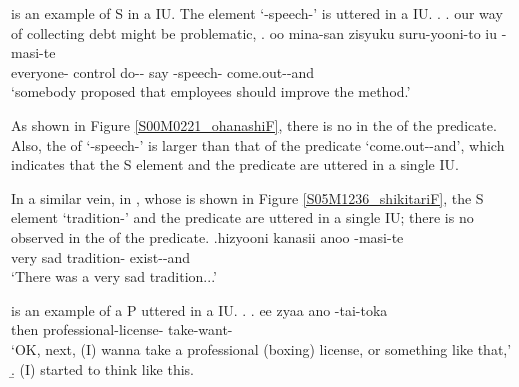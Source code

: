 \Next[b] is an example of S in a  IU.
The element  `-speech-'
is uttered in a  IU.
%
\ex.\label{S00M0221_ohanashi}
 \a. our way of collecting debt might be problematic,
 \bg. oo mina-san \tp{\dvline} zisyuku suru-yooni-to iu \tp{\dvline}  -masi-te \tp{\dvline} \\
 	 everyone- {} control do-- say {} -speech- come.out--and {} \\
 		`somebody proposed that employees should improve the method.'

As shown in Figure \ref{S00M0221_ohanashiF},
there is no  in the  of the predicate.
Also,
the  of  `-speech-' is larger
than that of the predicate  `come.out--and',
which indicates that the S element and the predicate are uttered in a single IU.

In a similar vein, in \Next,
whose  is shown in Figure \ref{S05M1236_shikitariF},
the S element  `tradition-' and the predicate
are uttered in a single IU;
there is no  observed in the  of the predicate.
%
\exg.\label{S05M1236_shikitari}hizyooni kanasii \tp{\dvline} anoo \tp{\dvline}  -masi-te \tp{\dvline} \\
	very sad {}  {} tradition- exist--and {} \\
	`There was a very sad tradition...'

\Next[a] is an example of a P uttered in a  IU.
%
\ex.\label{S01M0182_license}
 \ag. ee zyaa \tp{\dvline} ano  -tai-toka \tp{\dvline} \\
 		 then {}  professional-license- take-want- {} \\
		`OK, next, (I) wanna take a professional (boxing) license, or something like that,'
 \b. (I) started to think like this.

